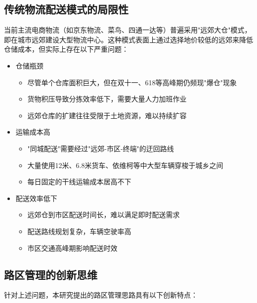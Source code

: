 \documentclass[12pt,a4paper,twoside]{ctexbook}
\begin{document}
\subsection{传统物流配送模式的局限性}
当前主流电商物流（如京东物流、菜鸟、四通一达等）普遍采用"远郊大仓"模式，即在城市远郊建设大型物流中心。这种模式表面上通过选择地价较低的远郊来降低仓储成本，但实际上存在以下严重问题：

\begin{itemize}
\item 仓储瓶颈
    \begin{itemize}
    \item 尽管单个仓库面积巨大，但在双十一、618等高峰期仍频现"爆仓"现象
    \item 货物积压导致分拣效率低下，需要大量人力加班作业
    \item 远郊仓库的扩建往往受限于土地资源，难以持续扩容
    \end{itemize}

\item 运输成本高
    \begin{itemize}
    \item "同城配送"需要经过"远郊-市区-终端"的迂回路线
    \item 大量使用12米、6.8米货车、依维柯等中大型车辆穿梭于城乡之间
    \item 每日固定的干线运输成本居高不下
    \end{itemize}

\item 配送效率低下
    \begin{itemize}
    \item 远郊仓到市区配送时间长，难以满足即时配送需求
    \item 配送路线规划复杂，车辆空驶率高
    \item 市区交通高峰期影响配送时效
    \end{itemize}
\end{itemize}

\subsection{路区管理的创新思维}
针对上述问题，本研究提出的路区管理思路具有以下创新特点：
\end{document}
